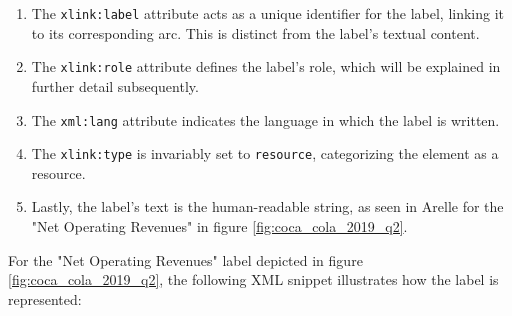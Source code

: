 


\begin{enumerate}
    \item The \texttt{xlink:label} attribute acts as a unique identifier for the label, linking it to its corresponding arc.  
    This is distinct from the label's textual content.  
    \item The \texttt{xlink:role} attribute defines the label's role, which will be explained in further detail subsequently.  
    \item The \texttt{xml:lang} attribute indicates the language in which the label is written.  
    \item The \texttt{xlink:type} is invariably set to \texttt{resource}, categorizing the element as a resource.  
    \item Lastly, the label's text is the human-readable string, as seen in Arelle for the "Net Operating Revenues" in figure \ref{fig:coca_cola_2019_q2}.  
\end{enumerate}

For the "Net Operating Revenues" label depicted in figure \ref{fig:coca_cola_2019_q2}, 
the following XML snippet illustrates how the label is represented:

